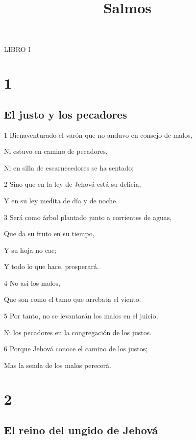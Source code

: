 

\title{Salmos}

\par LIBRO I

\chapter{1}

\section*{El justo y los pecadores}

\par 1 Bienaventurado el varón que no anduvo en consejo de malos,
\par Ni estuvo en camino de pecadores,
\par Ni en silla de escarnecedores se ha sentado;
\par 2 Sino que en la ley de Jehová está su delicia,
\par Y en su ley medita de día y de noche.
\par 3 Será como árbol plantado junto a corrientes de aguas,
\par Que da su fruto en su tiempo,
\par Y su hoja no cae;
\par Y todo lo que hace, prosperará.
\par 4 No así los malos,
\par Que son como el tamo que arrebata el viento.
\par 5 Por tanto, no se levantarán los malos en el juicio,
\par Ni los pecadores en la congregación de los justos.
\par 6 Porque Jehová conoce el camino de los justos;
\par Mas la senda de los malos perecerá.

\chapter{2}

\section*{El reino del ungido de Jehová}

